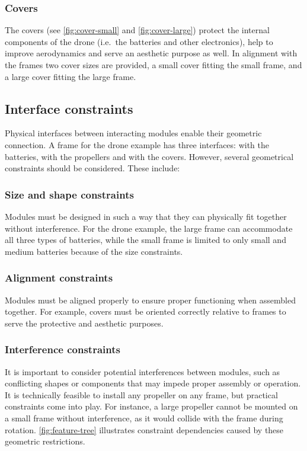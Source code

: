 \documentclass[sigconf,review,anonymous]{acmart}
\begin{document}
\subsubsection*{Covers}
\label{sec:covers}

The covers (see \cref{fig:cover-small} and \cref{fig:cover-large}) protect the internal components of the drone (i.e.~the batteries and other electronics), help to improve aerodynamics and serve an aesthetic purpose as well.
In alignment with the frames two cover sizes are provided, a small cover fitting the small frame, and a large cover fitting the large frame.

\subsection{Interface constraints}
\label{sec:contraints}

Physical interfaces between interacting modules enable their geometric connection. 
A frame for the drone example has three interfaces: with the batteries, with the propellers and with the covers. 
However, several geometrical constraints should be considered. These include:

\subsubsection*{Size and shape constraints}

Modules must be designed in such a way that they can physically fit together without interference. 
For the drone example, the large frame can accommodate all three types of batteries, while the small frame is limited to only small and medium batteries because of the size constraints.

\subsubsection*{Alignment constraints}

Modules must be aligned properly to ensure proper functioning when assembled together. 
For example, covers must be oriented correctly relative to frames to serve the protective and aesthetic purposes. 

\subsubsection*{Interference constraints}

It is important to consider potential interferences between modules, such as conflicting shapes or components that may impede proper assembly or operation. 
It is technically feasible to install any propeller on any frame, but practical constraints come into play. 
For instance, a large propeller cannot be mounted on a small frame without interference, as it would collide with the frame during rotation.
\cref{fig:feature-tree} illustrates constraint dependencies caused by these geometric restrictions.
\end{document}
